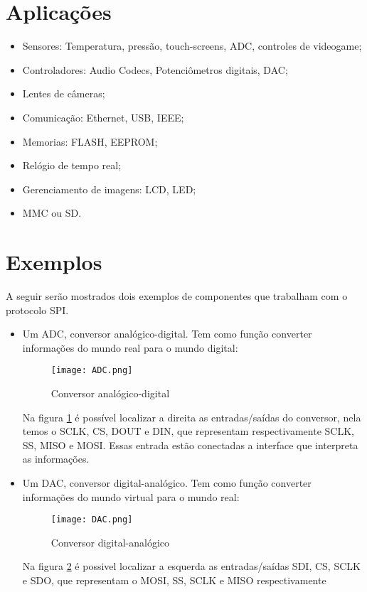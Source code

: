 \documentclass{article}
\begin{document}
    \section*{Aplicações}
        \begin{itemize}
            \item Sensores: Temperatura, pressão, touch-screens, ADC, controles de videogame;
            \item Controladores: Audio Codecs, Potenciômetros digitais, DAC;
            \item Lentes de câmeras;
            \item Comunicação: Ethernet, USB, IEEE;
            \item Memorias: FLASH, EEPROM;
            \item Relógio de tempo real;
            \item Gerenciamento de imagens: LCD, LED;
            \item MMC ou SD.
        \end{itemize}
    \section*{Exemplos}
        A seguir serão mostrados dois exemplos de componentes que trabalham com o protocolo SPI.
        \begin{itemize}
            \item
                Um ADC, conversor analógico-digital. Tem como função converter informações do mundo real para o mundo digital:
                \begin{figure}[H]
                    \centering
                    \texttt{[image: ADC.png]}
                    \caption{Conversor analógico-digital}
                    \label{fig:adc}
                \end{figure}
                Na figura \ref{fig:adc} é possível localizar a direita as entradas/saídas do conversor, nela temos o SCLK, CS, DOUT e DIN, que representam respectivamente SCLK, SS, MISO e MOSI. Essas entrada estão conectadas a interface que interpreta as informações.
            \item
                Um DAC, conversor digital-analógico. Tem como função converter informações do mundo virtual para o mundo real:
                \begin{figure}[H]
                    \centering
                    \texttt{[image: DAC.png]}
                    \caption{Conversor digital-analógico}
                    \label{fig:dac}
                \end{figure}
                Na figura \ref{fig:dac} é possivel localizar a esquerda as entradas/saídas SDI, CS, SCLK e SDO, que representam o MOSI, SS, SCLK e MISO respectivamente
        \end{itemize}
\end{document}
